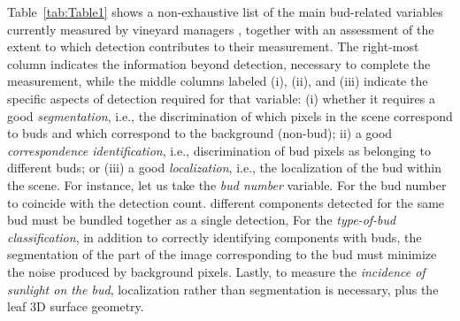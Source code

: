 \documentclass[a4paper,authoryear,review]{elsarticle}
\begin{document}
	Table~\ref{tab:Table1} shows a non-exhaustive list of the main bud-related variables currently measured by vineyard managers \citep{sanchez2005bud, noyce2016basis, collins2020effects}, together with an assessment of the extent to which detection contributes to their measurement. The right-most column indicates the information beyond detection, necessary to complete the measurement, while the middle columns labeled (i), (ii), and (iii) indicate the specific aspects of detection required for that variable: (i) whether it requires a good  \emph{segmentation}, i.e., the discrimination of which pixels in the scene correspond to buds and which correspond to the background (non-bud); ii) a good \emph{correspondence identification}, i.e., discrimination of bud pixels as belonging to different buds; or (iii) a good \emph{localization}, i.e., the localization of the bud within the scene.
	For instance, let us take the \emph{bud number} variable. For the bud number to coincide with the detection count.  different components detected for the same bud must be bundled together as a single detection, For the \emph{type-of-bud classification}, in addition to correctly identifying components with buds, the segmentation of the part of the image corresponding to the bud must minimize the noise produced by background pixels. Lastly, to measure the \emph{incidence of sunlight on the bud}, localization rather than segmentation is necessary, plus the  leaf 3D surface geometry.
	
\end{document}
